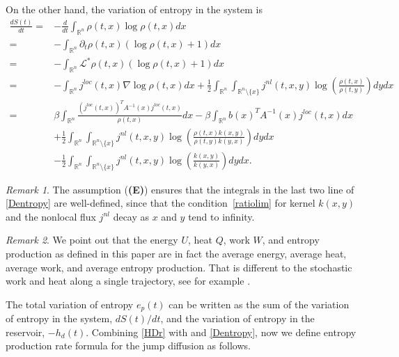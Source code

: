 \documentclass[10pt]{article}
\theoremstyle{definition}
\theoremstyle{remark}
\newtheorem{rem}{Remark}[section]
\numberwithin{equation}{section}
\begin{document}
On the other hand, the variation of entropy in the system is
\begin{align}\label{Dentropy}
   \frac{dS(t)}{dt}  = & -\frac{d}{dt} \int_{\mathbb{R}^n}\rho(t,x)\log \rho(t,x) dx \nonumber \\
                  = & -\int_{\mathbb{R}^n} \partial_t \rho(t,x) (\log \rho(t,x) +1) dx \nonumber\\
                  = & - \int_{\mathbb{R}^n} \mathcal{L}^{\ast}\rho(t,x) (\log \rho(t,x) +1) dx \nonumber\\
                  = & -\int_{\mathbb{R}^n} j^{loc}(t,x)\nabla \log \rho(t,x)dx  +\frac{1}{2} \int_{\mathbb{R}^n}\int_{\mathbb{R}^n \setminus \{x\}} j^{nl}(t,x,y)\log \left( \frac{\rho(t,x)}{\rho(t,y)} \right) dydx \nonumber\\
                   = &  \beta\int_{\mathbb{R}^n}  \frac{(j^{loc}(t,x))^TA^{-1}(x)j^{loc}(t,x)}{\rho(t,x)} dx - \beta \int_{\mathbb{R}^n} b(x)^T A^{-1}(x) j^{loc}(t,x) dx \nonumber \\
                   & +\frac{1}{2} \int_{\mathbb{R}^n}\int_{\mathbb{R}^n \setminus \{x\}}j^{nl}(t,x,y)\log \left( \frac{\rho(t,x)k(x,y)}{\rho(t,y)k(y,x)} \right) dydx \nonumber\\
                   & -\frac{1}{2} \int_{\mathbb{R}^n}\int_{\mathbb{R}^n \setminus \{x\}} j^{nl}(t,x,y)\log \left( \frac{k(x,y)}{k(y,x)} \right) dydx.
\end{align}

\begin{rem}\label{rmk:integrability_1}
    The assumption ({\bf (E)}) ensures that the integrals in the last two line of \eqref{Dentropy} are well-defined, since that the condition~\eqref{ratiolim} for kernel $k(x,y)$ and the nonlocal flux $j^{nl}$ decay as $x$ and $y$ tend to infinity.
\end{rem}
\begin{rem}
    We point out that the energy $U$, heat $Q$, work $W$, and entropy production as defined in this paper are in fact the average energy, average heat, average work, and average entropy production. That is different to the stochastic work and heat along a single trajectory, see for example \cite{stochasticQuantity}.
\end{rem}

The total variation of entropy $e_p(t)$ can be written as the sum of the variation of entropy in the system, $dS(t)/dt$, and the variation of entropy in the reservoir, $-h_{d}(t)$. Combining \eqref{HDr} with and \eqref{Dentropy}, now we define entropy production rate formula for the jump diffusion as follows.
\end{document}
